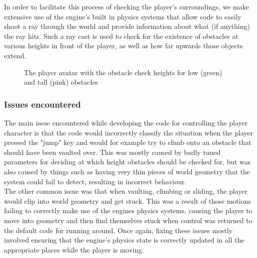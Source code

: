 \documentclass[11pt,a4paper]{article}
\begin{document}
In order to facilitate this process of checking the player's surroundings, we make extensive use of the engine's built in physics systems that allow code to easily shoot a ray through the world and provide information about what (if anything) the ray hits. Such a ray cast is used to check for the existence of obstacles at various heights in front of the player, as well as how far upwards those objects extend. \\
\begin{figure}[H]
    \caption{The player avatar with the obstacle check heights for low (green) and tall (pink) obstacles }
    \label{fig:raycastCheckHeights}
\end{figure}
\subsubsection{Issues encountered}
The main issue encountered while developing the code for controlling the player character is that the code would incorrectly classify the situation when the player pressed the "jump" key and would for example try to climb onto an obstacle that should have been vaulted over. This was mostly caused by badly tuned parameters for deciding at which height obstacles should be checked for, but was also caused by things such as having very thin pieces of world geometry that the system could fail to detect, resulting in incorrect behaviour. \\
The other common issue was that when vaulting, climbing or sliding, the player would clip into world geometry and get stuck. This was a result of those motions failing to correctly make use of the engines physics systems, causing the player to move into geometry and then find themselves stuck when control was returned to the default code for running around. Once again, fixing these issues mostly involved ensuring that the engine's physics state is correctly updated in all the appropriate places while the player is moving.
\end{document}
